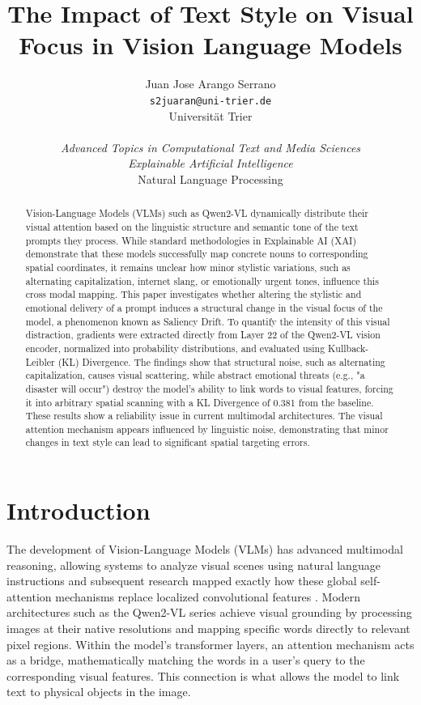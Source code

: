 \documentclass[11pt, letterpaper]{article}
\title{The Impact of Text Style on Visual Focus in Vision Language Models}
\date{}
\author{
  Juan Jose Arango Serrano \\
  \texttt{s2juaran@uni-trier.de} \\
  Universität Trier\\
  \vspace{0.3cm}
  \\
  \textit{Advanced Topics in Computational Text and Media Sciences} \\
  \textit{Explainable Artificial Intelligence} \\
  Natural Language Processing \\
}
\begin{document}
\maketitle

\begin{abstract}
Vision-Language Models (VLMs) such as Qwen2-VL dynamically distribute their visual attention based on the linguistic structure and semantic tone of the text prompts they process. While standard methodologies in Explainable AI (XAI) demonstrate that these models successfully map concrete nouns to corresponding spatial coordinates, it remains unclear how minor stylistic variations, such as alternating capitalization, internet slang, or emotionally urgent tones, influence this cross modal mapping. This paper investigates whether altering the stylistic and emotional delivery of a prompt induces a structural change in the visual focus of the model, a phenomenon known as Saliency Drift. To quantify the intensity of this visual distraction, gradients were extracted directly from Layer 22 of the Qwen2-VL vision encoder, normalized into probability distributions, and evaluated using Kullback-Leibler (KL) Divergence. The findings show that structural noise, such as alternating capitalization, causes visual scattering, while abstract emotional threats (e.g., "a disaster will occur") destroy the model's ability to link words to visual features, forcing it into arbitrary spatial scanning with a KL Divergence of 0.381 from the baseline. These results show a reliability issue in current multimodal architectures. The visual attention mechanism appears influenced by linguistic noise, demonstrating that minor changes in text style can lead to significant spatial targeting errors.
\end{abstract}

\section{Introduction}
The development of Vision-Language Models (VLMs) has advanced multimodal reasoning, allowing systems to analyze visual scenes using natural language instructions \cite{bordes2024introductionvisionlanguagemodeling} and subsequent research mapped exactly how these global self-attention mechanisms replace localized convolutional features \cite{park2022visiontransformerswork}. Modern architectures such as the Qwen2-VL series \citep{wang2024qwen2vlenhancingvisionlanguagemodels} achieve visual grounding by processing images at their native resolutions and mapping specific words directly to relevant pixel regions. Within the model's transformer layers, an attention mechanism acts as a bridge, mathematically matching the words in a user's query to the corresponding visual features. This connection is what allows the model to link text to physical objects in the image.
\end{document}
